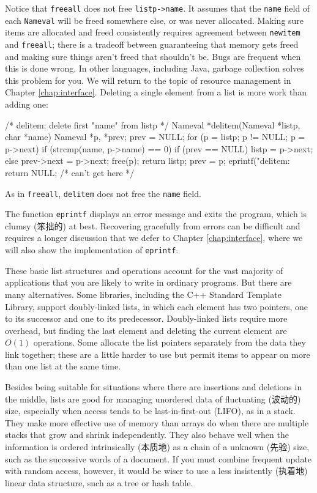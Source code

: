Notice that \verb'freeall' does not free \verb'listp->name'. It assumes
that the \verb'name' field of each \verb'Nameval' will be freed somewhere
else, or was never allocated. Making sure items are allocated and freed
consistently requires agreement between \verb'newitem' and \verb'freeall';
there is a tradeoff between guaranteeing that memory gets freed
and making sure things aren't freed that shouldn't be. Bugs are frequent
when this is done wrong. In other languages, including Java, garbage
collection solves this problem for you. We will return to the topic of
resource management in Chapter \ref{chap:interface}. Deleting a single
element from a list is more work than adding one:
\begin{wellcode}
    /* delitem: delete first "name" from listp */
    Nameval *delitem(Nameval *listp, char *name)
    {
        Nameval *p, *prev;
        prev = NULL;
        for (p = listp; p != NULL; p = p->next) {
            if (strcmp(name, p->name) == 0) {
                if (prev == NULL)
                    listp = p->next;
                else
                    prev->next = p->next;
                free(p);
                return listp;
            }
            prev = p;
        }
        eprintf("delitem: %
        return NULL;    /* can't get here */
    }
\end{wellcode}
As in \verb'freeall', \verb'delitem' does not free the \verb'name' field.

The function \verb'eprintf' displays an error message and exits the
program, which is clumsy (笨拙的) at best. Recovering gracefully from
errors can be difficult and requires a longer discussion that we defer to
Chapter \ref{chap:interface}, where we will also show the implementation of
\verb'eprintf'.

These basic list structures and operations account for the vast majority of
applications that you are likely to write in ordinary programs. But there
are many alternatives. Some libraries, including the C++ Standard Template
Library, support doubly-linked lists, in which each element has two
pointers, one to its successor and one to its predecessor. Doubly-linked
lists require more overhead, but finding the last element and deleting the
current element are $O(1)$ operations. Some allocate the list pointers
separately from the data they link together; these are a little harder to
use but permit items to appear on more than one list at the same time.

Besides being suitable for situations where there are insertions and
deletions in the middle, lists are good for managing unordered data of
fluctuating (波动的) size, especially when access tends to be
last-in-first-out (LIFO), as in a stack. They make more effective use of
memory than arrays do when there are multiple stacks that grow and shrink
independently. They also behave well when the information is ordered
intrinsically (本质地) as a chain of a unknown  (先验) size,
such as the successive words of a document. If you must combine frequent
update with random access, however, it would be wiser to use a less
insistently (执着地) linear data structure, such as a tree or hash table.

